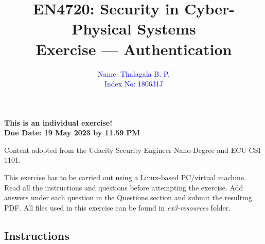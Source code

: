 \documentclass[11pt,letterpaper]{article}
\begin{document}
	
	\title{EN4720: Security in Cyber-Physical Systems \\ Exercise --- Authentication}
	
	\author{ \textcolor{blue}{Name: Thalagala B. P.} \\ \textcolor{blue}{Index No: 180631J}}
	
	\maketitle
	
	\begin{center}
		\color{red}\bf This is an individual exercise! \\ Due Date: 19 May 2023 by 11.59 PM
	\end{center}
	
	\begin{center}
		\small Content adopted from the Udacity Security Engineer Nano-Degree and ECU CSI 1101.    
	\end{center}
	
	\vspace{1in}
	
	This exercise has to be carried out using a Linux-based PC/virtual machine. Read all the instructions and questions before attempting the exercise. Add answers under each question in the Questions section and submit the resulting PDF. All files used in this exercise can be found in {\it ex3-resources} folder.
	
	\subsection*{Instructions}
	
\end{document}
